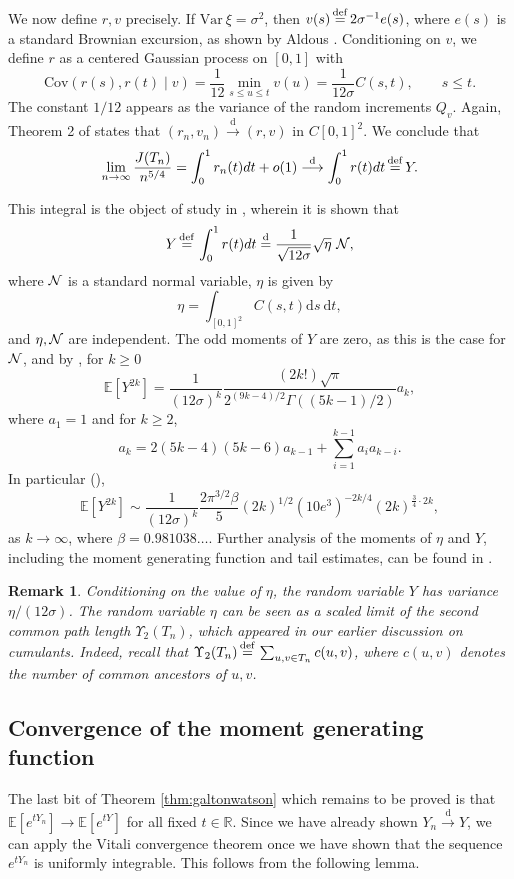 \documentclass[11pt]{article}
\newcommand{\E}[1]{\mathbb{E} \left[#1\right]}
\newcommand{\va}{{\mathrm{Var}}}
\newcommand\cN{{\cal N}}
\def\R{\mathbb{R}}
\def\QQ{Q}
\def\YY{Y}
\def\U{\Upsilon}
\def\b{\beta}
\def\G{\Gamma}
\def\s{\sigma}
\numberwithin{theorem}{section}
\newtheorem{remark}[theorem]{Remark}
\theoremstyle{definition}
\newcommand{\inlaw}{\dto}%
\newcommand{\eqd}{\,{\buildrel {\mathrm{def}} \over =}\,}
\newcommand{\eql}{\eqdd}%
\numberwithin{equation}{section}
\newcommand{\too}{\longrightarrow}
\newcommand\dto{\overset{\mathrm{d}}{\too}}
\newcommand\eqdd{\overset{\mathrm{d}}{=}}
\begin{document}
We now define $r, v$ precisely. If $\va\ \xi = \s^2$, then 
$v(s) \eqd 2\s^{-1} e(s)$, where $e(s)$ is a
standard Brownian excursion, as shown by Aldous \cite{a91, MR1207226}. Conditioning on $v$, we define $r$ as a
centered Gaussian process on $[0,1]$ with
$$
\text{Cov}(r(s), r(t) \mid v) = \frac{1}{12}\min_{s\leq u\leq t} v(u) 
=
\frac{1}{12\s} C(s, t),
\qquad s\le t.
$$
The constant $1/12$ appears as the variance of the random increments $\QQ_v$. Again, Theorem 2 of \cite{jm05} states that $(r_n, v_n) \dto (r, v)$ in $C[0,1]^2$. We conclude that
$$
\lim_{n\to\infty} \frac{J(T_n)}{n^{5/4}} =\int_0^1r_n(t)dt+o(1)
\dto \int_0^1 r(t)dt \eqd Y.
$$

This integral is the object of study in \cite{MR2108865}, wherein it is shown that
$$
Y \eqd \int_0^1 r(t)dt \eql \frac{1}{\sqrt{12\s}} \sqrt{\eta}\ \cN
,
$$
where $\cN$ is a standard normal variable, $\eta$ is given by
$$
\eta = \int_{[0, 1]^2} C(s, t) \mathrm ds\ \mathrm dt,
$$ 
and $\eta, \cN$ are independent. The odd moments of $Y$ are zero, as this is the case for $\cN$, and by \cite[Theorem 1.1]{MR2108865}, for $k\geq 0$
$$
\E{Y^{2k}} = \frac{1}{(12\s)^k} \frac{(2k!)\sqrt{\pi}}{2^{(9k-4)/2}\G((5k-1)/2)} a_k,
$$
where $a_1 = 1$ and for $k\geq 2$,
$$
a_k = 2(5k-4)(5k-6)a_{k-1} + \sum_{i=1}^{k-1}a_ia_{k-i}.
$$
In particular (\cite[Theorem 1.2]{MR2108865}),
$$
\E{Y^{2k}} \sim \frac{1}{(12\s)^k}\frac{2\pi^{3/2}\b}{5} (2k)^{1/2} (10e^3)^{-2k/4} (2k)^{\frac34 \cdot 2k},
$$
as $k\to\infty$, where $\b = 0.981038\dots$. Further analysis of the moments
of \(\eta\) and $Y$, including the moment
generating function and tail estimates, can be found in \cite{MR2108865}.

\begin{remark}
Conditioning on the value of $\eta$, the random variable $Y$ has variance
$\eta/(12\sigma)$. The
random variable $\eta$ can be seen as a scaled limit of the second common path length $\U_{2}(T_n)$,
which appeared in our earlier discussion on cumulants. Indeed, 
recall that 
\(\U_{2}(T_n) \eqd \sum_{u, v\in T_n} c(u, v)\),
where $c(u,v)$ denotes
the number of common ancestors of $u, v$. 
\end{remark}

\subsection{Convergence of the moment generating function}

The last bit of Theorem \ref{thm:galtonwatson} which remains to be proved is that \(\E{e^{t\YY_n}} \to
\E{e^{t\YY}}\) for all fixed \(t \in \R\). Since we have already shown
\(\YY_n \inlaw \YY\), we can apply the Vitali convergence theorem once we
have shown that the sequence \(e^{t \YY_n}\) is uniformly integrable. This
follows from the following lemma. 
\end{document}
